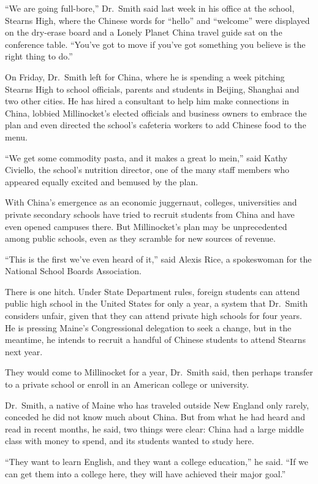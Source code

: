 ﻿\documentclass[12pt]{article}
\begin{document}
``We are going full-bore,'' Dr.~Smith said last week in his office at the school, Stearns High,
where the Chinese words for ``hello'' and ``welcome'' were displayed on the dry-erase board and a
Lonely Planet China travel guide sat on the conference table. ``You've got to move if you've got
something you believe is the right thing to do.''

On Friday, Dr.~Smith left for China, where he is spending a week pitching Stearns High to school
officials, parents and students in Beijing, Shanghai and two other cities. He has hired a consultant
to help him make connections in China, lobbied Millinocket's elected officials and business owners
to embrace the plan and even directed the school's cafeteria workers to add Chinese food to the
menu.

``We get some commodity pasta, and it makes a great lo mein,'' said Kathy Civiello, the school's
nutrition director, one of the many staff members who appeared equally excited and bemused by the
plan.

With China's emergence as an economic juggernaut, colleges, universities and private secondary
schools have tried to recruit students from China and have even opened campuses there. But
Millinocket's plan may be unprecedented among public schools, even as they scramble for new sources
of revenue.

``This is the first we've even heard of it,'' said Alexis Rice, a spokeswoman for the National
School Boards Association.

There is one hitch. Under State Department rules, foreign students can attend public high school in
the United States for only a year, a system that Dr.~Smith considers unfair, given that they can
attend private high schools for four years. He is pressing Maine's Congressional delegation to seek
a change, but in the meantime, he intends to recruit a handful of Chinese students to attend Stearns
next year.

They would come to Millinocket for a year, Dr.~Smith said, then perhaps transfer to a private school
or enroll in an American college or university.

Dr.~Smith, a native of Maine who has traveled outside New England only rarely, conceded he did not
know much about China. But from what he had heard and read in recent months, he said, two things
were clear: China had a large middle class with money to spend, and its students wanted to study
here.

``They want to learn English, and they want a college education,'' he said. ``If we can get them
into a college here, they will have achieved their major goal.''
\end{document}
